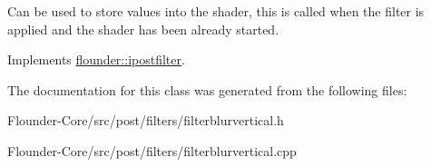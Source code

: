 Can be used to store values into the shader, this is called when the filter is applied and the shader has been already started. 



Implements \hyperlink{classflounder_1_1ipostfilter_a9b658b4672718d5ac36539875bde722e}{flounder\+::ipostfilter}.



The documentation for this class was generated from the following files\+:\begin{DoxyCompactItemize}
\item 
Flounder-\/\+Core/src/post/filters/filterblurvertical.\+h\item 
Flounder-\/\+Core/src/post/filters/filterblurvertical.\+cpp\end{DoxyCompactItemize}
